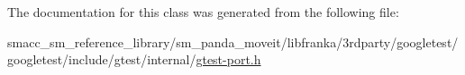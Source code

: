 The documentation for this class was generated from the following file\+:\begin{DoxyCompactItemize}
\item 
smacc\+\_\+sm\+\_\+reference\+\_\+library/sm\+\_\+panda\+\_\+moveit/libfranka/3rdparty/googletest/googletest/include/gtest/internal/\hyperlink{gtest-port_8h}{gtest-\/port.\+h}\end{DoxyCompactItemize}
